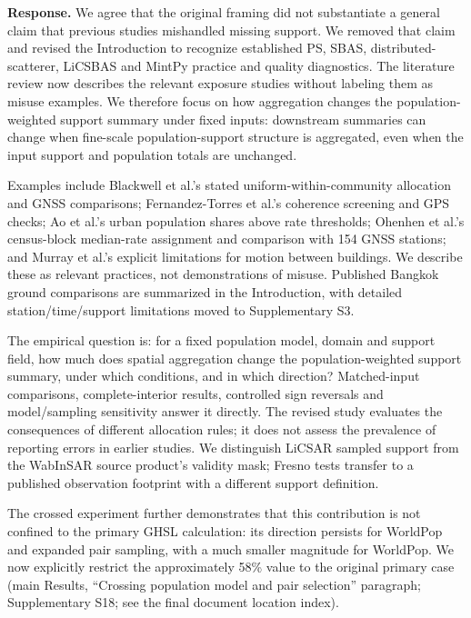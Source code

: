 \documentclass[11pt,a4paper]{article}
\begin{document}
\textbf{Response.} We agree that the original framing did not substantiate a general claim that previous studies mishandled missing support. We removed that claim and revised the Introduction to recognize established PS, SBAS, distributed-scatterer, LiCSBAS and MintPy practice and quality diagnostics. The literature review now describes the relevant exposure studies without labeling them as misuse examples. We therefore focus on how aggregation changes the population-weighted support summary under fixed inputs: downstream summaries can change when fine-scale population-support structure is aggregated, even when the input support and population totals are unchanged.

Examples include Blackwell et al.'s stated uniform-within-community allocation and GNSS comparisons; Fernandez-Torres et al.'s coherence screening and GPS checks; Ao et al.'s urban population shares above rate thresholds; Ohenhen et al.'s census-block median-rate assignment and comparison with 154 GNSS stations; and Murray et al.'s explicit limitations for motion between buildings. We describe these as relevant practices, not demonstrations of misuse. Published Bangkok ground comparisons are summarized in the Introduction, with detailed station/time/support limitations moved to Supplementary S3.

The empirical question is: for a fixed population model, domain and support field, how much does spatial aggregation change the population-weighted support summary, under which conditions, and in which direction? Matched-input comparisons, complete-interior results, controlled sign reversals and model/sampling sensitivity answer it directly. The revised study evaluates the consequences of different allocation rules; it does not assess the prevalence of reporting errors in earlier studies. We distinguish LiCSAR sampled support from the WabInSAR source product’s validity mask; Fresno tests transfer to a published observation footprint with a different support definition.

The crossed experiment further demonstrates that this contribution is not confined to the primary GHSL calculation: its direction persists for WorldPop and expanded pair sampling, with a much smaller magnitude for WorldPop. We now explicitly restrict the approximately 58\% value to the original primary case (main Results, “Crossing population model and pair selection” paragraph; Supplementary S18; see the final document location index).
\end{document}
